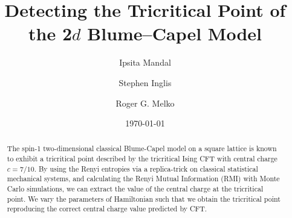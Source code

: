 \documentclass[aps,prl,superscriptaddress,twocolumn]{revtex4}
\begin{document}
\newcommand{\beq}{\begin{equation}}
\newcommand{\eeq}{\end{equation}}
\newcommand{\beqa}{\begin{eqnarray}}
\newcommand{\eeqa}{\end{eqnarray}}
\newcommand{\ben}{\begin{enumerate}}
\newcommand{\een}{\end{enumerate}}
\newcommand{\hs}{\hspace{0.5cm}}
\newcommand{\vs}{\vspace{0.5cm}}

\title{Detecting the Tricritical Point of the 2$d$ Blume--Capel Model}

\author{Ipsita Mandal}

\author{Stephen Inglis}


\author{Roger G. Melko}

\date{\today}

\begin{abstract}
The spin-1 two-dimensional classical Blume-Capel model on a square lattice 
is known to exhibit a tricritical point
described by the tricritical Ising CFT with central charge $c=7/10$.
By using the Renyi entropies via a replica-trick 
on classical statistical mechanical systems,
and calculating the Renyi Mutual Information (RMI) with Monte Carlo simulations,
we can extract the value of the central charge at the tricritical point. We vary the parameters of
Hamiltonian such that we obtain the tricritical point reproducing the
correct central charge value predicted by CFT.
\end{abstract}

\maketitle
\end{document}
